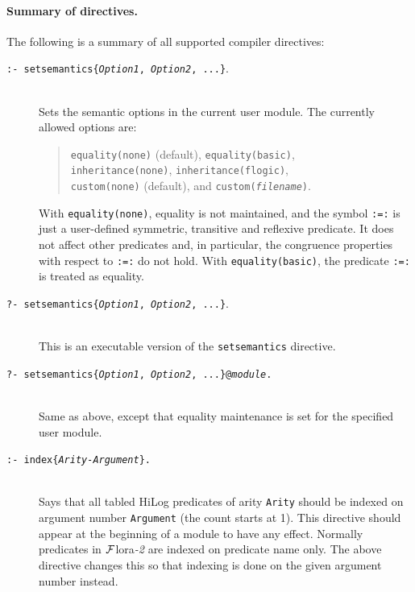 \documentclass[11pt]{article}
\newcommand{\FLSYSTEM}{{\mbox{\sc ${\cal F}${lora}\rm\emph{-2}}}\xspace}
\begin{document}
\paragraph{Summary of directives.}
The following is a summary of all supported compiler directives:
\begin{description}
  \item[{\tt :- setsemantics\{\emph{Option1}, \emph{Option2}, ...\}}.]
%
~~~\\
Sets the semantic options in the current user module.  The currently allowed
options are:
\begin{quote}
{\tt equality(none)} (default), {\tt equality(basic)},\\
{\tt inheritance(none)}, {\tt inheritance(flogic)},\\
{\tt custom(none)} (default), and {\tt custom(\emph{filename})}.
\end{quote}
  With {\tt equality(none)}, equality is not
maintained, and the symbol {\tt :=:} is just a user-defined symmetric,
transitive and reflexive predicate. It does not affect other predicates
and, in particular, the congruence properties with respect to \texttt{:=:} do
not hold.
With {\tt equality(basic)}, the predicate {\tt :=:} is treated as equality.
\item[{\tt ?- setsemantics\{\emph{Option1}, \emph{Option2}, ...\}}.]
  ~~~\\
  This is an executable version of the {\tt setsemantics} directive.
\item[{\tt ?- setsemantics\{\emph{Option1}, \emph{Option2}, ...\}@\emph{module}.}]
  ~~~\\
  Same as above, except that equality maintenance is set for the specified
  user module.
  
\item[\texttt{:- index\{\emph{Arity-Argument}\}.}]
  ~~~\\
  Says that all tabled HiLog predicates of arity {\tt Arity} should be indexed on
  argument number {\tt Argument} (the count starts at 1). This directive
  should appear at the beginning of a module to have any effect.
  Normally predicates in \FLSYSTEM are indexed on predicate name only.
  The  above directive changes this so that indexing is done on the given
  argument number instead.


\end{description}
\end{document}

